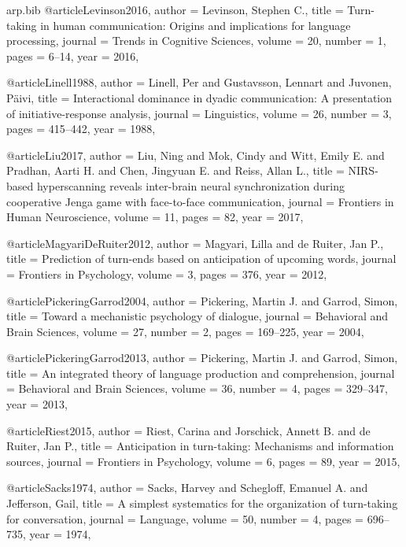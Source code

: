 \begin{filecontents*}[overwrite]{arp.bib}
@article{Levinson2016,
  author  = {Levinson, Stephen C.},
  title   = {Turn-taking in human communication: Origins and implications for language processing},
  journal = {Trends in Cognitive Sciences},
  volume  = {20},
  number  = {1},
  pages   = {6--14},
  year    = {2016},
}

@article{Linell1988,
  author  = {Linell, Per and Gustavsson, Lennart and Juvonen, P{\"a}ivi},
  title   = {Interactional dominance in dyadic communication: A presentation of initiative-response analysis},
  journal = {Linguistics},
  volume  = {26},
  number  = {3},
  pages   = {415--442},
  year    = {1988},
}

@article{Liu2017,
  author  = {Liu, Ning and Mok, Cindy and Witt, Emily E. and Pradhan, Aarti H. and Chen, Jingyuan E. and Reiss, Allan L.},
  title   = {{NIRS}-based hyperscanning reveals inter-brain neural synchronization during cooperative {Jenga} game with face-to-face communication},
  journal = {Frontiers in Human Neuroscience},
  volume  = {11},
  pages   = {82},
  year    = {2017},
}

@article{MagyariDeRuiter2012,
  author  = {Magyari, Lilla and de Ruiter, Jan P.},
  title   = {Prediction of turn-ends based on anticipation of upcoming words},
  journal = {Frontiers in Psychology},
  volume  = {3},
  pages   = {376},
  year    = {2012},
}

@article{PickeringGarrod2004,
  author  = {Pickering, Martin J. and Garrod, Simon},
  title   = {Toward a mechanistic psychology of dialogue},
  journal = {Behavioral and Brain Sciences},
  volume  = {27},
  number  = {2},
  pages   = {169--225},
  year    = {2004},
}

@article{PickeringGarrod2013,
  author  = {Pickering, Martin J. and Garrod, Simon},
  title   = {An integrated theory of language production and comprehension},
  journal = {Behavioral and Brain Sciences},
  volume  = {36},
  number  = {4},
  pages   = {329--347},
  year    = {2013},
}

@article{Riest2015,
  author  = {Riest, Carina and Jorschick, Annett B. and de Ruiter, Jan P.},
  title   = {Anticipation in turn-taking: Mechanisms and information sources},
  journal = {Frontiers in Psychology},
  volume  = {6},
  pages   = {89},
  year    = {2015},
}

@article{Sacks1974,
  author  = {Sacks, Harvey and Schegloff, Emanuel A. and Jefferson, Gail},
  title   = {A simplest systematics for the organization of turn-taking for conversation},
  journal = {Language},
  volume  = {50},
  number  = {4},
  pages   = {696--735},
  year    = {1974},
}


\end{filecontents*}
